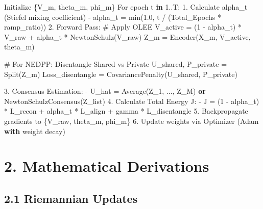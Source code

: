 \documentclass[
  letterpaper,
]{report}
\newenvironment{Shaded}{\begin{snugshade}}{\end{snugshade}}
\newcommand{\BuiltInTok}[1]{\textcolor[rgb]{0.00,0.23,0.31}{#1}}
\newcommand{\CommentTok}[1]{\textcolor[rgb]{0.37,0.37,0.37}{#1}}
\newcommand{\ControlFlowTok}[1]{\textcolor[rgb]{0.00,0.23,0.31}{\textbf{#1}}}
\newcommand{\DecValTok}[1]{\textcolor[rgb]{0.68,0.00,0.00}{#1}}
\newcommand{\FloatTok}[1]{\textcolor[rgb]{0.68,0.00,0.00}{#1}}
\newcommand{\KeywordTok}[1]{\textcolor[rgb]{0.00,0.23,0.31}{\textbf{#1}}}
\newcommand{\NormalTok}[1]{\textcolor[rgb]{0.00,0.23,0.31}{#1}}
\newcommand{\OperatorTok}[1]{\textcolor[rgb]{0.37,0.37,0.37}{#1}}
\begin{document}
\begin{Shaded}
\begin{Highlighting}[]
\NormalTok{Initialize \{V\_m, theta\_m, phi\_m\}}
\NormalTok{For epoch t }\KeywordTok{in} \FloatTok{1.}\NormalTok{.T:}
    \FloatTok{1.}\NormalTok{ Calculate alpha\_t (Stiefel mixing coefficient)}
       \OperatorTok{{-}}\NormalTok{ alpha\_t }\OperatorTok{=} \BuiltInTok{min}\NormalTok{(}\FloatTok{1.0}\NormalTok{, t }\OperatorTok{/}\NormalTok{ (Total\_Epochs }\OperatorTok{*}\NormalTok{ ramp\_ratio))}
    \FloatTok{2.}\NormalTok{ Forward Pass:}
       \CommentTok{\# Apply OLEE}
\NormalTok{       V\_active }\OperatorTok{=}\NormalTok{ (}\DecValTok{1} \OperatorTok{{-}}\NormalTok{ alpha\_t) }\OperatorTok{*}\NormalTok{ V\_raw }\OperatorTok{+}\NormalTok{ alpha\_t }\OperatorTok{*}\NormalTok{ NewtonSchulz(V\_raw)}
\NormalTok{       Z\_m }\OperatorTok{=}\NormalTok{ Encoder(X\_m, V\_active, theta\_m)}
       
       \CommentTok{\# For NEDPP: Disentangle Shared vs Private}
\NormalTok{       U\_shared, P\_private }\OperatorTok{=}\NormalTok{ Split(Z\_m)}
\NormalTok{       Loss\_disentangle }\OperatorTok{=}\NormalTok{ CovariancePenalty(U\_shared, P\_private)}
       
    \FloatTok{3.}\NormalTok{ Consensus Estimation:}
       \OperatorTok{{-}}\NormalTok{ U\_hat }\OperatorTok{=}\NormalTok{ Average(Z\_1, ..., Z\_M) }\KeywordTok{or}\NormalTok{ NewtonSchulzConsensus(Z\_list)}
    \FloatTok{4.}\NormalTok{ Calculate Total Energy J:}
       \OperatorTok{{-}}\NormalTok{ J }\OperatorTok{=}\NormalTok{ (}\DecValTok{1} \OperatorTok{{-}}\NormalTok{ alpha\_t) }\OperatorTok{*}\NormalTok{ L\_recon }\OperatorTok{+}\NormalTok{ alpha\_t }\OperatorTok{*}\NormalTok{ L\_align }\OperatorTok{+}\NormalTok{ gamma }\OperatorTok{*}\NormalTok{ L\_disentangle}
    \FloatTok{5.}\NormalTok{ Backpropagate gradients to \{V\_raw, theta\_m, phi\_m\}}
    \FloatTok{6.}\NormalTok{ Update weights via Optimizer (Adam }\ControlFlowTok{with}\NormalTok{ weight decay)}
\end{Highlighting}
\end{Shaded}

\section{2. Mathematical Derivations}\label{mathematical-derivations}

\subsection{2.1 Riemannian Updates}\label{riemannian-updates}
\end{document}
